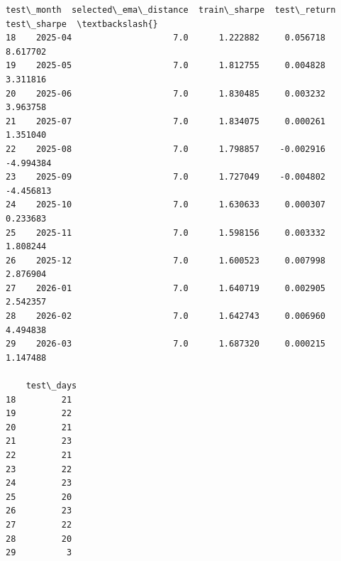 \documentclass[11pt]{article}
\makeatletter
\newcommand{\boxspacing}{\kern\kvtcb@left@rule\kern\kvtcb@boxsep}
\newcommand{\prompt}[4]{
        {\ttfamily\llap{{\color{#2}[#3]:\hspace{3pt}#4}}\vspace{-\baselineskip}}
    }
\makeatother
\begin{document}
    
            \begin{tcolorbox}[breakable, size=fbox, boxrule=.5pt, pad at break*=1mm, opacityfill=0]
\prompt{Out}{outcolor}{15}{\boxspacing}
\begin{Verbatim}[commandchars=\\\{\}]
   test\_month  selected\_ema\_distance  train\_sharpe  test\_return  test\_sharpe  \textbackslash{}
18    2025-04                    7.0      1.222882     0.056718     8.617702
19    2025-05                    7.0      1.812755     0.004828     3.311816
20    2025-06                    7.0      1.830485     0.003232     3.963758
21    2025-07                    7.0      1.834075     0.000261     1.351040
22    2025-08                    7.0      1.798857    -0.002916    -4.994384
23    2025-09                    7.0      1.727049    -0.004802    -4.456813
24    2025-10                    7.0      1.630633     0.000307     0.233683
25    2025-11                    7.0      1.598156     0.003332     1.808244
26    2025-12                    7.0      1.600523     0.007998     2.876904
27    2026-01                    7.0      1.640719     0.002905     2.542357
28    2026-02                    7.0      1.642743     0.006960     4.494838
29    2026-03                    7.0      1.687320     0.000215     1.147488

    test\_days
18         21
19         22
20         21
21         23
22         21
23         22
24         23
25         20
26         23
27         22
28         20
29          3
\end{Verbatim}
\end{tcolorbox}
        
\end{document}
